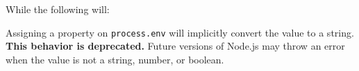 While the following will:

\begin{Shaded}
\begin{Highlighting}[]
 \OperatorTok{;}

 \OperatorTok{=} \OperatorTok{;}
\NormalTok{)}\OperatorTok{;}
\end{Highlighting}
\end{Shaded}

\begin{Shaded}
\begin{Highlighting}[]
\OperatorTok{=} \NormalTok{(}\NormalTok{)}\OperatorTok{;}

 \OperatorTok{=} \OperatorTok{;}
\NormalTok{)}\OperatorTok{;}
\end{Highlighting}
\end{Shaded}

Assigning a property on \texttt{process.env} will implicitly convert the
value to a string. \textbf{This behavior is deprecated.} Future versions
of Node.js may throw an error when the value is not a string, number, or
boolean.

\begin{Shaded}
\begin{Highlighting}[]
 \OperatorTok{;}

 \OperatorTok{=} \OperatorTok{;}
\NormalTok{)}\OperatorTok{;}
 \OperatorTok{=} \OperatorTok{;}
\NormalTok{)}\OperatorTok{;}
\end{Highlighting}
\end{Shaded}

